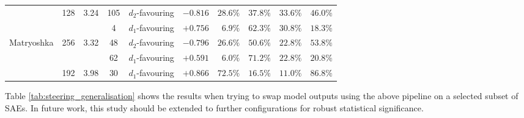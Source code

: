 \begin{table}[t]
\begin{tabular}{l c c c l c rrrr}
\addlinespace
& \multirow{2}{*}{128} & \multirow{2}{*}{3.24} & 105 & $d_2$-favouring & $-0.816$ & $28.6\%$ & $37.8\%$ & $33.6\%$ & $46.0\%$ \\
& & & 4 & $d_1$-favouring & $+0.756$ & $6.9\%$ & $62.3\%$ & $30.8\%$ & $18.3\%$ \\
\midrule
\multirow{3}{*}{Matryoshka} & \multirow{2}{*}{256} & \multirow{2}{*}{3.32} & 48 & $d_2$-favouring & $-0.796$ & $26.6\%$ & $50.6\%$ & $22.8\%$ & $53.8\%$ \\
& & & 62 & $d_1$-favouring & $+0.591$ & $6.0\%$ & $71.2\%$ & $22.8\%$ & $20.8\%$ \\
\addlinespace
& 192 & 3.98 & 30 & $d_1$-favouring & $+0.866$ & $72.5\%$ & $16.5\%$ & $11.0\%$ & $86.8\%$ \\
\bottomrule
\end{tabular}
\end{table}

Table \ref{tab:steering_generalisation} shows the results when trying to swap model outputs using the above pipeline on a selected subset of SAEs.
In future work, this study should be extended to further configurations for robust statistical significance.
